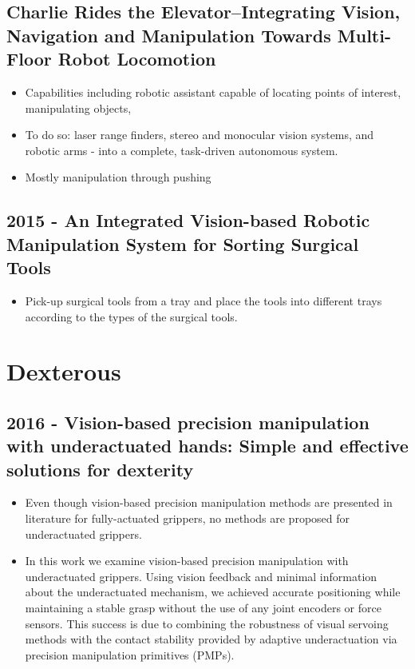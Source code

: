 \subsection{Charlie Rides the Elevator–Integrating Vision, Navigation and Manipulation Towards Multi-Floor Robot Locomotion}
\begin{itemize}
\item Capabilities including  robotic assistant capable of locating points of interest, manipulating objects,
\item To do so: laser range finders, stereo and monocular vision systems, and robotic arms - into a complete, task-driven autonomous system.
\item Mostly manipulation through pushing
\end{itemize}

\subsection{2015 - An Integrated Vision-based Robotic Manipulation System for Sorting Surgical Tools}
\begin{itemize}
\item Pick-up surgical tools from a tray and place the tools into different trays according to the types of the surgical tools.  
\end{itemize}

\vspace{3cm}

\section{Dexterous}
\subsection{2016 - Vision-based precision manipulation with underactuated hands: Simple and effective solutions for dexterity}
\begin{itemize}
\item Even though vision-based precision manipulation methods are presented in literature for fully-actuated grippers, no methods are proposed for underactuated grippers.
\item In this work we examine vision-based precision manipulation with underactuated grippers. Using vision feedback and minimal information about the underactuated mechanism, we achieved accurate positioning while maintaining a stable grasp without the use of any joint encoders or force sensors. This success is due to combining the robustness of visual servoing methods with the contact stability provided by adaptive underactuation via precision manipulation primitives (PMPs).
\end{itemize}

